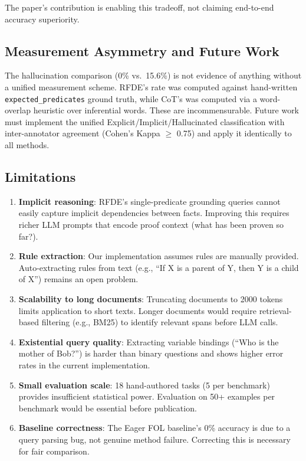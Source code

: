 \documentclass[11pt,letterpaper]{article}
\begin{document}
The paper's contribution is enabling this tradeoff, not claiming end-to-end accuracy superiority.

\subsection{Measurement Asymmetry and Future Work}

The hallucination comparison (0\% vs.\ 15.6\%) is not evidence of anything without a unified measurement scheme. RFDE's rate
was computed against hand-written \texttt{expected\_predicates} ground truth, while CoT's was computed via a word-overlap
heuristic over inferential words. These are incommensurable. Future work must implement the unified
Explicit/Implicit/Hallucinated classification with inter-annotator agreement (Cohen's Kappa $\geq$ 0.75) and apply it
identically to all methods.

\subsection{Limitations}

\begin{enumerate}
  \item \textbf{Implicit reasoning}: RFDE's single-predicate grounding queries cannot easily capture implicit dependencies
    between facts. Improving this requires richer LLM prompts that encode proof context (what has been proven so far?).

  \item \textbf{Rule extraction}: Our implementation assumes rules are manually provided. Auto-extracting rules from text
    (e.g., ``If X is a parent of Y, then Y is a child of X'') remains an open problem.

  \item \textbf{Scalability to long documents}: Truncating documents to 2000 tokens limits application to short texts. Longer
    documents would require retrieval-based filtering (e.g., BM25) to identify relevant spans before LLM calls.

  \item \textbf{Existential query quality}: Extracting variable bindings (``Who is the mother of Bob?'') is harder than
    binary questions and shows higher error rates in the current implementation.

  \item \textbf{Small evaluation scale}: 18 hand-authored tasks (5 per benchmark) provides insufficient statistical power.
    Evaluation on 50+ examples per benchmark would be essential before publication.

  \item \textbf{Baseline correctness}: The Eager FOL baseline's 0\% accuracy is due to a query parsing bug, not genuine
    method failure. Correcting this is necessary for fair comparison.
\end{enumerate}
\end{document}
